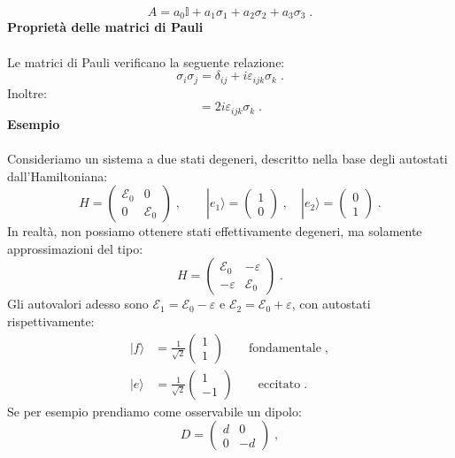 \documentclass[10pt,a4paper]{report}
\theoremstyle{definition}
\numberwithin{equation}{section}
\newcommand{\ket}{\rangle}
\begin{document}
$$
A=a_0 \mathbb{I}+a_1 \sigma_1+a_2\sigma_2+a_3 \sigma_3\;.
$$
\textbf{Proprietà delle matrici di Pauli} \\
\\
Le matrici di Pauli verificano la seguente relazione:
\begin{equation}
\sigma_i\sigma_j=\delta_{ij}+i\varepsilon_{ijk}\sigma_k\;.
\end{equation}
Inoltre:
\begin{equation}
[\sigma_i,\sigma_j]=2i\varepsilon_{ijk}\sigma_k\;.
\end{equation}
\textbf{Esempio} \\
\\
Consideriamo un sistema a due stati degeneri, descritto nella base degli autostati dall'Hamiltoniana:
$$
H=\left(
\begin{matrix}
\mathcal{E}_0 & 0 \\
0 & \mathcal{E}_0
\end{matrix}\right)\;, \qquad |e_1\ket=\left(
\begin{matrix}
1 \\
0
\end{matrix}\right)\;,\quad |e_2\ket=\left(
\begin{matrix}
0 \\
1
\end{matrix}\right)\;.
$$
In realtà, non possiamo ottenere stati effettivamente degeneri, ma solamente approssimazioni del tipo:
$$
H=\left(
\begin{matrix}
\mathcal{E}_0 & -\varepsilon \\
-\varepsilon & \mathcal{E}_0
\end{matrix}\right)\;.
$$
Gli autovalori adesso sono $\mathcal{E}_1=\mathcal{E}_0-\varepsilon$ e $\mathcal{E}_2=\mathcal{E}_0+\varepsilon$, con autostati rispettivamente:
\begin{align*}
|f\ket&=\frac{1}{\sqrt{2}}\left(
\begin{matrix}
1 \\
1
\end{matrix}\right) \qquad \mbox{fondamentale}\;, \\
|e\ket&=\frac{1}{\sqrt{2}}\left(
\begin{matrix}
1 \\
-1
\end{matrix}\right) \qquad \mbox{eccitato}\;.
\end{align*}
Se per esempio prendiamo come osservabile un dipolo:
$$
D=\left(
\begin{matrix}
d & 0 \\
0 & -d
\end{matrix}\right)\;,
$$
\end{document}
